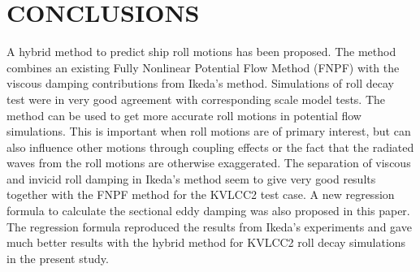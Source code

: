 \section*{CONCLUSIONS}\label{conclusions}
A hybrid method to predict ship roll motions has been proposed. The
method combines an existing Fully Nonlinear Potential Flow Method (FNPF)
with the viscous damping contributions from Ikeda's method. Simulations
of roll decay test were in very good agreement with corresponding scale
model tests. The method can be used to get more accurate roll motions in
potential flow simulations. This is important when roll motions are of
primary interest, but can also influence other motions through coupling
effects or the fact that the radiated waves from the roll motions are
otherwise exaggerated. The separation of viscous and invicid roll
damping in Ikeda's method seem to give very good results together with
the FNPF method for the KVLCC2 test case.
\quad A new regression formula to calculate the sectional eddy damping
was also proposed in this paper. The regression formula reproduced the
results from Ikeda's experiments and gave much better results with the
hybrid method for KVLCC2 roll decay simulations in the present study.
